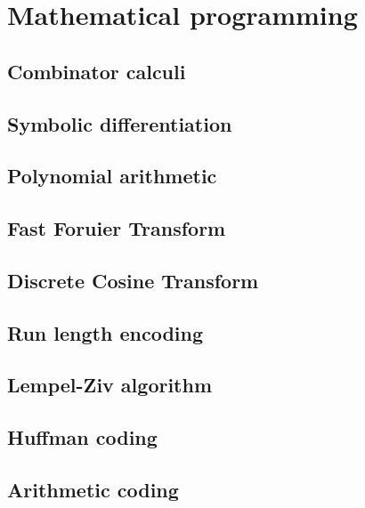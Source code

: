 
\chapter{Mathematical programming}

\section{Combinator calculi}

\section{Symbolic differentiation}

\section{Polynomial arithmetic}

\section{Fast Foruier Transform}

\section{Discrete Cosine Transform}

\section{Run length encoding}

\section{Lempel-Ziv algorithm}

\section{Huffman coding}

\section{Arithmetic coding}
